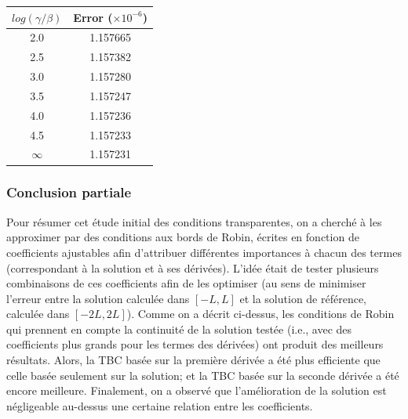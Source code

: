 \begingroup
\begin{center}
		\begin{tabular}{c|c}
			$log(\gamma/\beta)$ & Error ($\times 10^{-6}$) \\
			\hline
			2.0 & 1.157665\\
			2.5 & 1.157382\\
			3.0 & 1.157280\\
			3.5 & 1.157247\\
			4.0 & 1.157236\\
			4.5 & 1.157233\\
			$\infty$ & 1.157231	
		\end{tabular}
\end{center}
\endgroup

\subsubsection{Conclusion partiale} 

\indent Pour résumer cet étude initial des conditions transparentes, on a cherché à les approximer par des conditions aux bords de Robin, écrites en fonction de coefficients ajustables afin d'attribuer différentes importances à chacun des termes (correspondant à la solution et à ses dérivées). L'idée était de tester plusieurs combinaisons de ces coefficients afin de les optimiser (au sens de minimiser l'erreur entre la solution calculée dans $[-L,L]$ et la solution de référence, calculée dans $[-2L,2L]$). Comme on a décrit ci-dessus, les conditions de Robin qui prennent en compte la continuité de la solution testée (i.e., avec des coefficients plus grands pour les termes des dérivées) ont produit des meilleurs résultats. Alors, la TBC basée sur la première dérivée a été plus efficiente que celle basée seulement sur la solution; et la TBC basée sur la seconde dérivée a été encore meilleure. Finalement, on a observé que l'amélioration de la solution est négligeable au-dessus une certaine relation entre les coefficients.
















